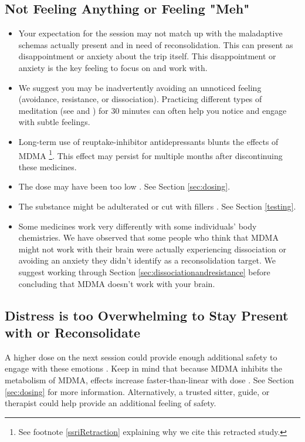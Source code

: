 \documentclass[12pt,letterpaper]{book}
\begin{document}
\subsection*{Not Feeling Anything or Feeling "Meh"}
\begin{itemize}
    \item Your expectation for the session may not match up with the maladaptive schemas actually present and in need of reconsolidation. This can present as disappointment or anxiety about the trip itself. This disappointment or anxiety is the key feeling to focus on and work with.
    \item We suggest you may be inadvertently avoiding an unnoticed feeling (avoidance, resistance, or dissociation). Practicing different types of meditation (see \textcite{rain} and \textcite{bodyscan}) for 30 minutes can often help you notice and engage with subtle feelings.
    \item Long-term use of reuptake-inhibitor antidepressants blunts the effects of MDMA \cite{feducciaSSRIDiscontinuation} \footnote{See footnote \ref{ssriRetraction} explaining why we cite this retracted study.}. This effect may persist for multiple months after discontinuing these medicines.
    \item The dose may have been too low \cite{bediMDMALowDose}. See Section \ref{sec:dosing}.
    \item The substance might be adulterated or cut with fillers \cite{saleemiAdulterants}. See Section \ref{testing}.
    \item Some medicines work very differently with some individuals' body chemistries. We have observed that some people who think that MDMA might not work with their brain were actually experiencing dissociation or avoiding an anxiety they didn't identify as a reconsolidation target. We suggest working through Section \ref{sec:dissociationandresistance} before concluding that MDMA doesn't work with your brain. 
\end{itemize}
\subsection*{Distress is too Overwhelming to Stay Present with or Reconsolidate}
A higher dose on the next session could provide enough additional safety to engage with these emotions \cite{regan2021Connection}. Keep in mind that because MDMA inhibits the metabolism of MDMA, effects increase faster-than-linear with dose \cite{de2000nonlinear}. See Section \ref{sec:dosing} for more information. Alternatively, a trusted sitter, guide, or therapist could help provide an additional feeling of safety.
\end{document}
